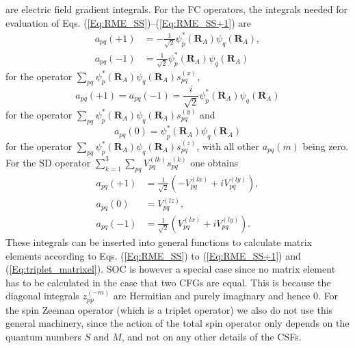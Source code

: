 are electric field gradient integrals. For the FC operators, the integrals needed for evaluation of Eqs. (\ref{Eq:RME_SS})--(\ref{Eq:RME_SS+1}) are 
	\begin{align}{a_{pq}}( + 1) &=  - \frac{1}{{\sqrt 2 }}\psi _p^ * ({{\mathbf{R}}_A}){\psi _q}({{\mathbf{R}}_A}), \\
	{a_{pq}}( - 1) &= \frac{1}{{\sqrt 2 }}\psi _p^ * ({{\mathbf{R}}_A}){\psi _q}({{\mathbf{R}}_A})
	\end{align} 	
for the operator $\sum\limits_{pq} {\psi _p^ * } ({{\mathbf{R}}_A}){\psi _q}({{\mathbf{R}}_A})s_{pq}^{(x)}$,
	\begin{equation}{a_{pq}}( + 1) = {a_{pq}}( - 1) = \frac{i}{{\sqrt 2 }}\psi _p^ * ({{\mathbf{R}}_A}){\psi _q}({{\mathbf{R}}_A})
	\end{equation} 	
for the operator $\sum\limits_{pq} {\psi _p^ * } ({{\mathbf{R}}_A}){\psi _q}({{\mathbf{R}}_A})s_{pq}^{(y)}$ and
	\begin{equation}{a_{pq}}(0) = \psi _p^ * ({{\mathbf{R}}_A}){\psi _q}({{\mathbf{R}}_A})
	\end{equation} 	
for the operator $\sum\limits_{pq} {\psi _p^ * } ({{\mathbf{R}}_A}){\psi _q}({{\mathbf{R}}_A})s_{pq}^{(z)}$, with all other ${a_{pq}}(m)$ being zero.
For the SD operator $\sum\limits_{k = 1}^3 {\sum\limits_{pq} {V_{pq}^{(lk)}} } s_{pq}^{(k)}$ one obtains
	\begin{align}
	{a_{pq}}( + 1) &= \frac{1}{{\sqrt 2 }}( - V_{pq}^{(lx)} + iV_{pq}^{(ly)}), \\
	{a_{pq}}(0) &= V_{pq}^{(lz)}, \\
	{a_{pq}}( - 1) &= \frac{1}{{\sqrt 2 }}(V_{pq}^{(lx)} + iV_{pq}^{(ly)}).
	\end{align} 	
These integrals can be inserted into general functions to calculate matrix elements according to Eqs. (\ref{Eq:RME_SS}) to (\ref{Eq:RME_SS+1}) and (\ref{Eq:triplet_matrixel}). SOC is however a special case since no matrix element has to be calculated in the case that two CFGs are equal. This is because the diagonal integrals $z_{pp}^{( - m)}$ are Hermitian and purely imaginary and hence 0. For the spin Zeeman operator (which is a triplet operator) we also do not use this general machinery, since the action of the total spin operator only depends on the quantum numbers $S$ and $M$, and not on any other details of the CSFs.
